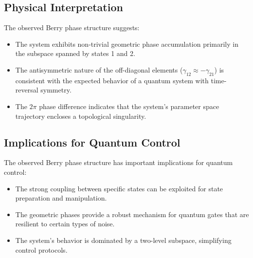 \documentclass{article}
\begin{document}
\subsection{Physical Interpretation}
The observed Berry phase structure suggests:

\begin{itemize}
    \item The system exhibits non-trivial geometric phase accumulation primarily in the subspace spanned by states 1 and 2.
    \item The antisymmetric nature of the off-diagonal elements ($\gamma_{12} \approx -\gamma_{21}$) is consistent with the expected behavior of a quantum system with time-reversal symmetry.
    \item The $2\pi$ phase difference indicates that the system's parameter space trajectory encloses a topological singularity.
\end{itemize}

\subsection{Implications for Quantum Control}
The observed Berry phase structure has important implications for quantum control:

\begin{itemize}
    \item The strong coupling between specific states can be exploited for state preparation and manipulation.
    \item The geometric phases provide a robust mechanism for quantum gates that are resilient to certain types of noise.
    \item The system's behavior is dominated by a two-level subspace, simplifying control protocols.
\end{itemize}
\end{document}

